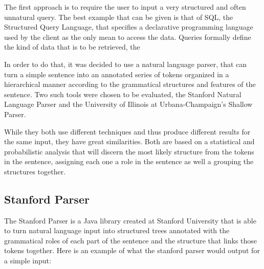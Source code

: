 The first approach is to require the user to input a very structured and often unnatural query. The best example that can be given is that of SQL, the Structured Query Language, that specifies a declarative programming language used by the client as the only mean to access the data. Queries formally define the kind of data that is to be retrieved, the 


 In order to do that, it was decided to use a natural language parser, that can turn a simple sentence into an annotated series of tokens organized in a hierarchical manner according to the grammatical structures and features of the sentence. Two such tools were chosen to be evaluated, the Stanford Natural Language Parser and the University of Illinois at Urbana-Champaign's Shallow Parser. 

While they both use different techniques and thus produce different results for the same input, they have great similarities. Both are based on a statistical and probabilistic analysis that will discern the most likely structure from the tokens in the sentence, assigning each one a role in the sentence as well a grouping the structures together.

\subsection{Stanford Parser} %
\label{sub:stanford_parser}
The Stanford Parser is a Java library created at Stanford University that is able to turn natural language input into structured trees annotated with the grammatical roles of each part of the sentence and the structure that links those tokens together. Here is an example of what the stanford parser would output for a simple input:
